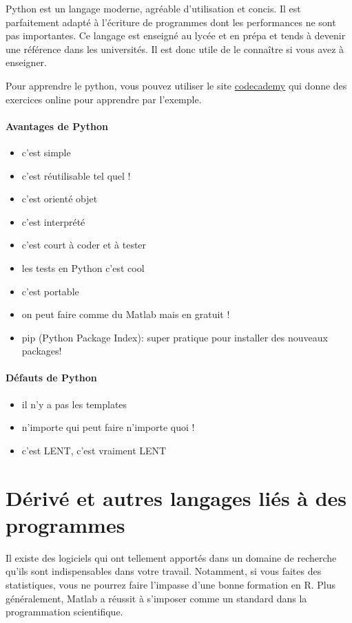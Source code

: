 Python est un langage moderne, agréable d'utilisation et concis.
Il est parfaitement adapté à l'écriture de programmes dont les performances ne sont
pas importantes. Ce langage est enseigné au lycée et en prépa et tends à devenir une référence
dans les universités. Il est donc utile de le connaître si vous avez à enseigner.

Pour apprendre le python, vous pouvez utiliser le site \href{http://www.codecademy.com/tracks/python}{codecademy} 
qui donne des exercices online pour apprendre par l'exemple.


\paragraph{Avantages de Python}
\begin{itemize}
\item c'est simple
\item c'est réutilisable tel quel ! 
\item c'est orienté objet
\item c'est interprété
\item c'est court à coder et à  tester
\item les tests en Python c'est cool %
\item c'est portable
\item on peut faire comme du Matlab mais en gratuit ! %
\item pip (Python Package Index): super pratique pour installer des nouveaux packages!
\end{itemize}

\paragraph{Défauts de Python}
\begin{itemize}
\item il n'y a pas les templates
\item n'importe qui peut faire n'importe quoi ! %
\item c'est LENT, c'est vraiment LENT
\end{itemize}

\section{Dérivé et autres langages liés à des programmes}

Il existe des logiciels qui ont tellement apportés dans un domaine de recherche qu'ils sont 
indispensables dans votre travail. Notamment, si vous faites des statistiques, vous ne pourrez
 faire l'impasse d'une bonne formation en R. Plus généralement, Matlab a réussit à s'imposer 
comme un standard dans la programmation scientifique.\\

